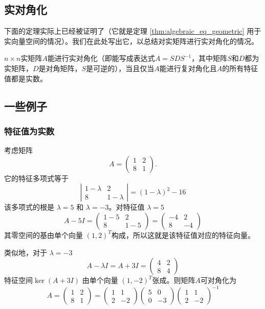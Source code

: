 \subsection{实对角化}

下面的定理实际上已经被证明了（它就是定理 \ref{thm:algebraic_eq_geometric} 用于实向量空间的情况）。我们在此处写出它，以总结对实矩阵进行实对角化的情况。

\begin{theorem}\label{thm:diagonalizable_iff_real}
    $n\times n$实矩阵$A$能进行实对角化（即能写成表达式$A=SDS^{-1}$，其中矩阵$S$和$D$都为实矩阵，$D$是对角矩阵，$S$是可逆的），当且仅当$A$能进行复对角化且$A$的所有特征值都是实数。
\end{theorem}

\subsection{一些例子}

\subsubsection{特征值为实数}

考虑矩阵
$$A = \left( \begin{array}{cc} 1 & 2 \\ 8 & 1 \end{array} \right).$$
它的特征多项式等于
$$
\left| \begin{array}{cc} 1 - \lambda & 2 \\ 8 & 1 - \lambda \end{array} \right| = (1 - \lambda)^2 - 16$$
该多项式的根是 $\lambda = 5$ 和 $\lambda = -3$。对特征值 $\lambda = 5$
$$A - 5I = \left( \begin{array}{cc} 1 - 5 & 2 \\ 8 & 1 - 5 \end{array} \right) = \left( \begin{array}{cc} -4 & 2 \\ 8 & -4 \end{array} \right)$$
其零空间的基由单个向量 $(1,2)^T$构成，所以这就是该特征值对应的特征向量。

类似地，对于 $\lambda = -3$
$$
A - \lambda I = A + 3I = \left( \begin{array}{cc} 4 & 2 \\ 8 & 4 \end{array} \right)$$
特征空间$\ker (A+3I)$ 由单个向量 $( 1, - 2) ^T$张成。则矩阵$A$可对角化为
$$A=\left(\begin{array}{cc}1&2\\8&1\end{array}\right)=\left(\begin{array}{cc}1&1\\2&-2\end{array}\right)\left(\begin{array}{cc}5&0\\0&-3\end{array}\right)\left(\begin{array}{cc}1&1\\2&-2\end{array}\right)^{-1}$$

